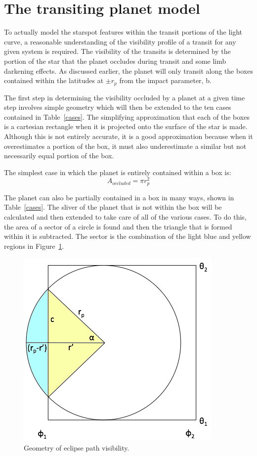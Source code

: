 









\section{The transiting planet model \label{transit_model}}
To actually model the starspot features within the transit portions of the light curve, a reasonable understanding of the visibility profile of a transit for any given system is required. The visibility of the transits is determined by the portion of the star that the planet occludes during transit and some limb darkening effects. As discussed earlier, the planet will only transit along the boxes contained within the latitudes at $\pm r_p$ from the impact parameter, b. 
 
The first step in determining the visibility occluded by a planet at a given time step involves simple geometry which will then be extended to the ten cases contained in Table~\ref{cases}. The simplifying approximation that each of the boxes is a cartesian rectangle when it is projected onto the surface of the star is made. Although this is not entirely accurate, it is a good approximation because when it overestimates a portion of the box, it must also underestimate a similar but not necessarily equal portion of the box.

The simplest case in which the planet is entirely contained within a box is:
\begin{equation}
	A_{occluded} = \pi r_p^2
\end{equation}

The planet can also be partially contained in a box in many ways, shown in Table~\ref{cases}. The sliver of the planet that is not within the box will be calculated and then extended to take care of all of the various cases. To do this, the area of a sector of a circle is found and then the triangle that is formed within it is subtracted. The sector is the combination of the light blue and yellow regions in Figure~\ref{eclipse}.
\begin{figure}[h]
	\centering
	\includegraphics[width=.5\textwidth]{images/figure.png}
	\caption{Geometry of eclipse path visibility.}
	\label{eclipse}
\end{figure}

